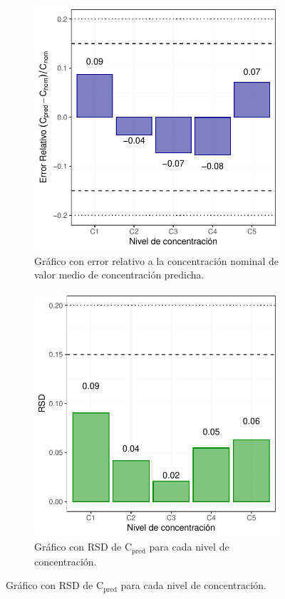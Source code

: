 \documentclass{article}
\begin{document}
\begin{figure}[h]
	\centering
	\begin{subfigure}[b]{0.49\textwidth}
		\centering
		\includegraphics[width=1\linewidth]{Figuras/27_Exactitud_metodo.pdf}
		\caption{Gráfico con error relativo a la concentración nominal de valor medio de concentración predicha.}
		\label{Fig:RSD_A}
	\end{subfigure}
	\hfill
	\begin{subfigure}[b]{0.49\textwidth}
	\centering
	\includegraphics[width=1\linewidth]{Figuras/28_Repetibilidad_metodo.pdf}
	\caption{Gráfico con RSD de $\mathrm{C_{pred}}$ para cada nivel de concentración.}
	\label{Fig:RSD_B}
	\end{subfigure}


\end{figure}
\end{document}
